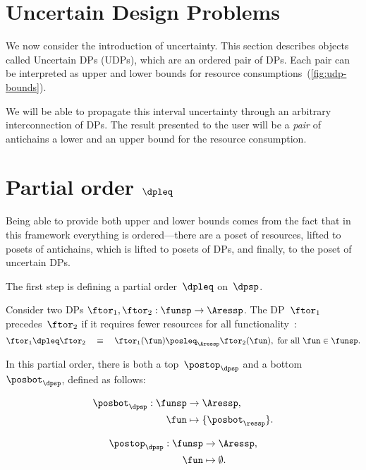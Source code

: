 \section{Uncertain Design Problems}
\label{sec:UDP}

We now consider the introduction of uncertainty.
This section describes
objects called Uncertain DPs (UDPs), which are an ordered pair of
DPs.
Each pair can be interpreted as upper and lower bounds for resource
consumptions~(\cref{fig:udp-bounds}).


We will be able to propagate this interval uncertainty through an
arbitrary interconnection of DPs.
The result presented to the user
will be a \emph{pair} of antichains \textemdash{} a lower and an upper
bound for the resource consumption.

\section{Partial order $\dpleq$}

Being able to provide both upper and lower bounds comes from the fact
that in this framework everything is ordered---there are
a poset of resources, lifted to posets of antichains, which is lifted
to posets of DPs, and finally, to the poset of uncertain DPs.

The first step is defining a partial order~$\dpleq$ on~$\dpsp$.
\begin{definition}
    Consider two DPs $\ftor_{1},\ftor_{2}:\funsp\rightarrow\Aressp$.
    The DP~$\ftor_{1}$ precedes~$\ftor_{2}$ if it requires fewer resources
    for all functionality~\fun:
    \[
        \ftor_{1}\dpleq\ftor_{2}\quad\equiv\quad\ftor_{1}(\fun)\posleq_{\Aressp}\ftor_{2}(\fun),\ \text{for all }\fun\in\funsp.
    \]
\end{definition}

In this partial order, there is both a top~$\postop_{\dpsp}$ and a
bottom~$\posbot_{\dpsp}$, defined as follows:

\vspace{-5mm}

\begin{minipage}[t]{0.4\columnwidth}
    \begin{align*}
        \posbot_{\dpsp}:\funsp & \rightarrow\Aressp,          \\
        \fun                   & \mapsto\{\posbot_{\ressp}\}.
    \end{align*}

\end{minipage}
\begin{minipage}[t]{0.4\columnwidth}
    \begin{align}
        \postop_{\dpsp}:\funsp & \rightarrow\Aressp,\nonumber    \\
        \fun                   & \mapsto\emptyset.\label{eq:top}
    \end{align}

\end{minipage}


